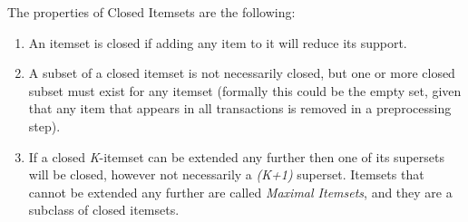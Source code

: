 \documentclass{sig-alternate}
\begin{document}
The properties of Closed Itemsets are the following:
\begin{enumerate}
\item An itemset is closed if adding any item to it will reduce its support. 
\item A subset of a closed itemset is not necessarily closed, but one or more closed subset must exist for any itemset (formally this could be the empty set, given that any item that appears in all transactions is removed in a preprocessing step). 
\item If a closed \emph{K}-itemset can be extended any further then one of its supersets will be closed, however not necessarily a \emph{(K+1)} superset. Itemsets that cannot be extended any further are called \emph{Maximal Itemsets}, and they are a subclass of closed itemsets.
\end{enumerate}
\end{document}
